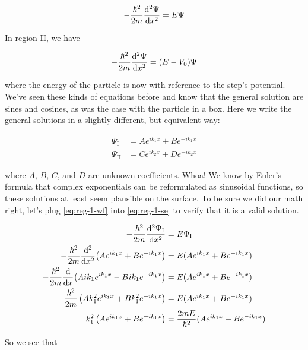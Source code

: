 \begin{equation}
	-\frac{\hbar^2}{2m} \dv[2]{\Psi}{x} = E\Psi \label{eq:reg-1-se}
\end{equation}

In region II, we have

\begin{equation}
	-\frac{\hbar^2}{2m} \dv[2]{\Psi}{x} = (E-V_0)\Psi \label{eq:reg-2-se}
\end{equation}

\noindent where the energy of the particle is now with reference to the step's potential. 
We've seen these kinds of equations before and know that the general solution are sines and cosines, as was the case with the particle in a box. 
Here we write the general solutions in a slightly different, but equivalent way:

\begin{tcolorbox}[title = Traveling wave solutions] \vspace{-2ex}
	\begin{align}
		\Psi_{\text{I}} &= Ae^{ik_1x} + Be^{-ik_1x} \label{eq:reg-1-wf} \\
		\Psi_{\text{II}} &= Ce^{ik_2x} + De^{-ik_2x} \label{eq:reg-2-wf} 
	\end{align}
\end{tcolorbox}

\noindent where $A$, $B$, $C$, and $D$ are unknown coefficients. 
Whoa! 
We know by Euler's formula that complex exponentials can be reformulated as sinusoidal functions, so these solutions at least seem plausible on the surface. 
To be sure we did our math right, let's plug \autoref{eq:reg-1-wf} into \autoref{eq:reg-1-se} to verify that it is a valid solution.

\begin{align*}
	-\frac{\hbar^2}{2m} \dv[2]{\Psi_{\text{I}}}{x} &= E\Psi_{\text{I}} \\
	-\frac{\hbar^2}{2m} \dv[2]{x}(Ae^{ik_1x} + Be^{-ik_1x}) &= E(Ae^{ik_1x} + Be^{-ik_1x}) \\
	-\frac{\hbar^2}{2m} \dv{x}(Aik_1e^{ik_1x} - Bik_1e^{-ik_1x}) &= E(Ae^{ik_1x} + Be^{-ik_1x}) \\
	\frac{\hbar^2}{2m} \left(Ak_1^2e^{ik_1x} + Bk_1^2e^{-ik_1x}\right) &= E(Ae^{ik_1x} + Be^{-ik_1x}) \\
	k_1^2\left(Ae^{ik_1x} + Be^{-ik_1x}\right) &= \frac{2mE}{\hbar^2}(Ae^{ik_1x} + Be^{-ik_1x})
\end{align*}

So we see that


